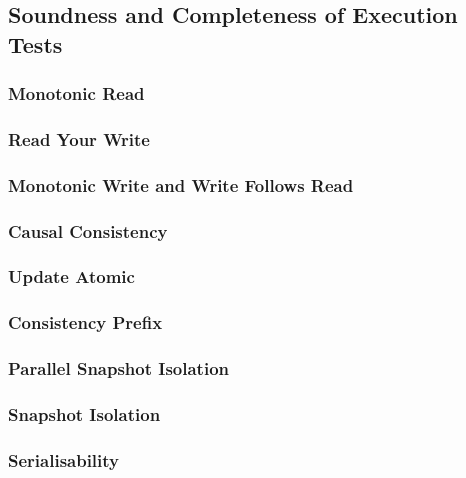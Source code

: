 \subsection{Soundness and Completeness of Execution Tests} 
            \label{sec:sound-complete-et}  
    \subsubsection{Monotonic Read} \label{sec:sound-complete-mr} 
    \subsubsection{Read Your Write} \label{sec:sound-complete-ryw} 
    \subsubsection{Monotonic Write and Write Follows Read} 
            \label{sec:sound-complete-mw} \label{sec:sound-complete-wfr}  
    \subsubsection{Causal Consistency} \label{sec:sound-complete-cc}  
    \subsubsection{Update Atomic} \label{sec:sound-complete-ua} 
    \subsubsection{Consistency Prefix} \label{sec:sound-complete-cp} 
    \subsubsection{Parallel Snapshot Isolation} \label{sec:sound-complete-psi} 
    \subsubsection{Snapshot Isolation} \label{sec:sound-complete-si} 
    \subsubsection{Serialisability} \label{sec:sound-complete-ser} 
